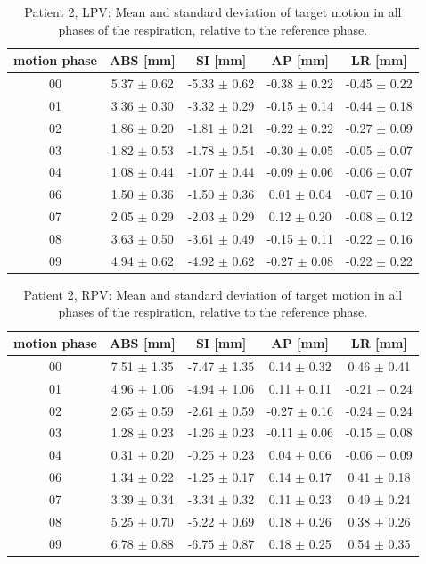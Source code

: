\documentclass[type=dr, dr=rernat, accentcolor=tud7b,colorbacktitle, bigchapter, openright, twoside, 12pt ]{tudthesis}
\begin{document}
\newpage

\begin{table}[H]
  \centering
  \caption{Patient 2, LPV: Mean and standard deviation of target motion in all phases of the respiration, relative to the reference phase.}
  \begin{tabular}{|c|c|c|c|c|}
    \hline\hline
    motion phase & ABS [mm] & SI [mm] & AP [mm] & LR [mm]\\
    \hline 
00& 5.37 $\pm$ 0.62& -5.33 $\pm$ 0.62& -0.38 $\pm$ 0.22& -0.45 $\pm$ 0.22 \\
01& 3.36 $\pm$ 0.30& -3.32 $\pm$ 0.29& -0.15 $\pm$ 0.14& -0.44 $\pm$ 0.18 \\
02& 1.86 $\pm$ 0.20& -1.81 $\pm$ 0.21& -0.22 $\pm$ 0.22& -0.27 $\pm$ 0.09 \\
03& 1.82 $\pm$ 0.53& -1.78 $\pm$ 0.54& -0.30 $\pm$ 0.05& -0.05 $\pm$ 0.07 \\
04& 1.08 $\pm$ 0.44& -1.07 $\pm$ 0.44& -0.09 $\pm$ 0.06& -0.06 $\pm$ 0.07 \\
06& 1.50 $\pm$ 0.36& -1.50 $\pm$ 0.36& 0.01 $\pm$ 0.04& -0.07 $\pm$ 0.10 \\
07& 2.05 $\pm$ 0.29& -2.03 $\pm$ 0.29& 0.12 $\pm$ 0.20& -0.08 $\pm$ 0.12 \\
08& 3.63 $\pm$ 0.50& -3.61 $\pm$ 0.49& -0.15 $\pm$ 0.11& -0.22 $\pm$ 0.16 \\
09& 4.94 $\pm$ 0.62& -4.92 $\pm$ 0.62& -0.27 $\pm$ 0.08& -0.22 $\pm$ 0.22 \\
        \hline\hline
  \end{tabular}
\end{table}

\begin{table}[H]
  \centering
  \caption{Patient 2, RPV: Mean and standard deviation of target motion in all phases of the respiration, relative to the reference phase.}
  \begin{tabular}{|c|c|c|c|c|}
    \hline\hline
    motion phase & ABS [mm] & SI [mm] & AP [mm] & LR [mm]\\
    \hline 
00& 7.51 $\pm$ 1.35& -7.47 $\pm$ 1.35& 0.14 $\pm$ 0.32& 0.46 $\pm$ 0.41 \\
01& 4.96 $\pm$ 1.06& -4.94 $\pm$ 1.06& 0.11 $\pm$ 0.11& -0.21 $\pm$ 0.24 \\
02& 2.65 $\pm$ 0.59& -2.61 $\pm$ 0.59& -0.27 $\pm$ 0.16& -0.24 $\pm$ 0.24 \\
03& 1.28 $\pm$ 0.23& -1.26 $\pm$ 0.23& -0.11 $\pm$ 0.06& -0.15 $\pm$ 0.08 \\
04& 0.31 $\pm$ 0.20& -0.25 $\pm$ 0.23& 0.04 $\pm$ 0.06& -0.06 $\pm$ 0.09 \\
06& 1.34 $\pm$ 0.22& -1.25 $\pm$ 0.17& 0.14 $\pm$ 0.17& 0.41 $\pm$ 0.18 \\
07& 3.39 $\pm$ 0.34& -3.34 $\pm$ 0.32& 0.11 $\pm$ 0.23& 0.49 $\pm$ 0.24 \\
08& 5.25 $\pm$ 0.70& -5.22 $\pm$ 0.69& 0.18 $\pm$ 0.26& 0.38 $\pm$ 0.26 \\
09& 6.78 $\pm$ 0.88& -6.75 $\pm$ 0.87& 0.18 $\pm$ 0.25& 0.54 $\pm$ 0.35 \\
        \hline\hline
  \end{tabular}
\end{table}
\end{document}
